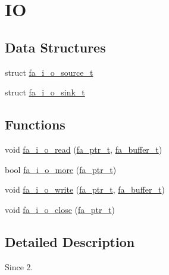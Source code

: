 \hypertarget{group___fa_i_o}{\section{I\-O}
\label{group___fa_i_o}
}
\subsection*{Data Structures}
\begin{DoxyCompactItemize}
\item 
struct \hyperlink{structfa__i__o__source__t}{fa\-\_\-i\-\_\-o\-\_\-source\-\_\-t}
\item 
struct \hyperlink{structfa__i__o__sink__t}{fa\-\_\-i\-\_\-o\-\_\-sink\-\_\-t}
\end{DoxyCompactItemize}
\subsection*{Functions}
\begin{DoxyCompactItemize}
\item 
void \hyperlink{group___fa_i_o_ga4ef7888ad874c3ed961e1ef3b2233782}{fa\-\_\-i\-\_\-o\-\_\-read} (\hyperlink{group___fa_ga915ddeae99ad7568b273d2b876425197}{fa\-\_\-ptr\-\_\-t}, \hyperlink{group___fa_buffer_ga0ed7a1d783ab322e2e8be02432d0839e}{fa\-\_\-buffer\-\_\-t})
\item 
bool \hyperlink{group___fa_i_o_ga41730217ce70a52147e508329dbe72d7}{fa\-\_\-i\-\_\-o\-\_\-more} (\hyperlink{group___fa_ga915ddeae99ad7568b273d2b876425197}{fa\-\_\-ptr\-\_\-t})
\item 
void \hyperlink{group___fa_i_o_ga15f25549ef3f47ac48015eddf547c2f0}{fa\-\_\-i\-\_\-o\-\_\-write} (\hyperlink{group___fa_ga915ddeae99ad7568b273d2b876425197}{fa\-\_\-ptr\-\_\-t}, \hyperlink{group___fa_buffer_ga0ed7a1d783ab322e2e8be02432d0839e}{fa\-\_\-buffer\-\_\-t})
\item 
void \hyperlink{group___fa_i_o_ga9dd446f605cfc5d369c799abab33041a}{fa\-\_\-i\-\_\-o\-\_\-close} (\hyperlink{group___fa_ga915ddeae99ad7568b273d2b876425197}{fa\-\_\-ptr\-\_\-t})
\end{DoxyCompactItemize}


\subsection{Detailed Description}
\begin{DoxySince}{Since}
2. 
\end{DoxySince}


